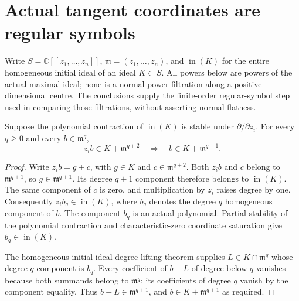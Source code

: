 \section{Actual tangent coordinates are regular symbols}

Write $S=\mathbb C[[z_1,\ldots,z_n]]$, $\mathfrak m=(z_1,\ldots,z_n)$,
and $\operatorname{in}(K)$ for the entire homogeneous initial ideal of
an ideal $K\subset S$. All powers below are powers of the actual maximal
ideal; none is a normal-power filtration along a positive-dimensional
centre. The conclusions supply the finite-order regular-symbol step used
in comparing those filtrations, without asserting normal flatness.

\begin{theorem}
\label{hir:actual-initial-tangent-formal-regular-symbol}
\leanok
Suppose the polynomial contraction of $\operatorname{in}(K)$ is stable
under $\partial/\partial z_i$. For every $q\geq0$ and every
$b\in\mathfrak m^q$,
\[
 z_i b\in K+\mathfrak m^{q+2}\quad\Longrightarrow\quad
 b\in K+\mathfrak m^{q+1}.
\]
\end{theorem}
\begin{proof}
Write $z_i b=g+c$, with $g\in K$ and
$c\in\mathfrak m^{q+2}$. Both $z_i b$ and $c$ belong to
$\mathfrak m^{q+1}$, so $g\in\mathfrak m^{q+1}$. Its degree
$q+1$ component therefore belongs to $\operatorname{in}(K)$.
The same component of $c$ is zero, and multiplication by $z_i$
raises degree by one. Consequently $z_i b_q\in\operatorname{in}(K)$,
where $b_q$ denotes the degree $q$ homogeneous component of $b$.
The component $b_q$ is an actual polynomial. Partial stability of the
polynomial contraction and characteristic-zero coordinate saturation give
$b_q\in\operatorname{in}(K)$.

The homogeneous initial-ideal degree-lifting theorem supplies
$L\in K\cap\mathfrak m^q$ whose degree $q$ component is $b_q$.
Every coefficient of $b-L$ of degree below $q$ vanishes because both
summands belong to $\mathfrak m^q$; its coefficients of degree $q$
vanish by the component equality. Thus $b-L\in\mathfrak m^{q+1}$,
and $b\in K+\mathfrak m^{q+1}$ as required.
\end{proof}

